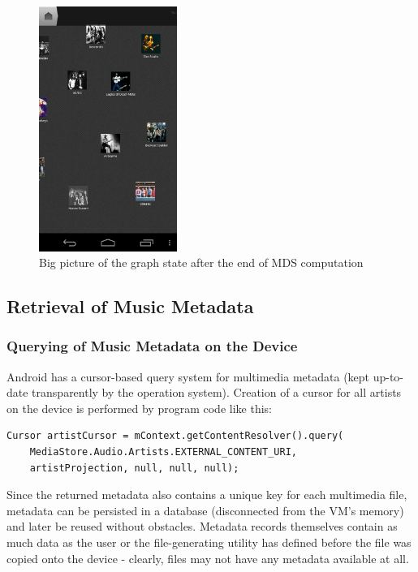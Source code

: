 \begin{figure}[H]
  \centering
    \includegraphics[width=0.4\textwidth]{figures/screen_mds_11_final_big_picture}
  \caption{Big picture of the graph state after the end of MDS computation}
\end{figure}

\subsection{Retrieval of Music Metadata}

\subsubsection{Querying of Music Metadata on the Device}

Android has a cursor-based query system for multimedia metadata (kept up-to-date transparently by the
operation system). Creation of a cursor for all artists on the device is performed by program code like this:

\begin{verbatim}
Cursor artistCursor = mContext.getContentResolver().query(
	MediaStore.Audio.Artists.EXTERNAL_CONTENT_URI,
    artistProjection, null, null, null);
\end{verbatim}

Since the returned metadata also contains a unique key for each multimedia file, metadata can be
persisted in a database (disconnected from the VM's memory) and later be reused without obstacles.
Metadata records themselves contain as much data as the user or the file-generating utility has defined
before the file was copied onto the device - clearly, files may not have any metadata available at all.

